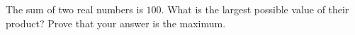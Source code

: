 The sum of two real numbers is $100$. What is the largest possible value of their product? Prove that your answer is the maximum.
